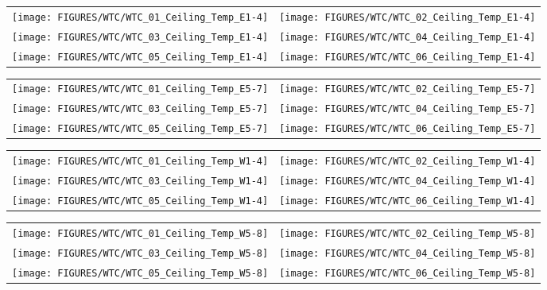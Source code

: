 \begin{figure}[p]
\begin{tabular*}{\textwidth}{l@{\extracolsep{\fill}}r}
\texttt{[image: FIGURES/WTC/WTC\_01\_Ceiling\_Temp\_E1-4]} &
\texttt{[image: FIGURES/WTC/WTC\_02\_Ceiling\_Temp\_E1-4]} \\
\texttt{[image: FIGURES/WTC/WTC\_03\_Ceiling\_Temp\_E1-4]} &
\texttt{[image: FIGURES/WTC/WTC\_04\_Ceiling\_Temp\_E1-4]} \\
\texttt{[image: FIGURES/WTC/WTC\_05\_Ceiling\_Temp\_E1-4]} &
\texttt{[image: FIGURES/WTC/WTC\_06\_Ceiling\_Temp\_E1-4]}
\end{tabular*}
\label{NIST_WTC_Ceiling_E1-4}
\end{figure}

\begin{figure}[p]
\begin{tabular*}{\textwidth}{l@{\extracolsep{\fill}}r}
\texttt{[image: FIGURES/WTC/WTC\_01\_Ceiling\_Temp\_E5-7]} &
\texttt{[image: FIGURES/WTC/WTC\_02\_Ceiling\_Temp\_E5-7]} \\
\texttt{[image: FIGURES/WTC/WTC\_03\_Ceiling\_Temp\_E5-7]} &
\texttt{[image: FIGURES/WTC/WTC\_04\_Ceiling\_Temp\_E5-7]} \\
\texttt{[image: FIGURES/WTC/WTC\_05\_Ceiling\_Temp\_E5-7]} &
\texttt{[image: FIGURES/WTC/WTC\_06\_Ceiling\_Temp\_E5-7]}
\end{tabular*}
\label{NIST_WTC_Ceiling_E5-7}
\end{figure}

\begin{figure}[p]
\begin{tabular*}{\textwidth}{l@{\extracolsep{\fill}}r}
\texttt{[image: FIGURES/WTC/WTC\_01\_Ceiling\_Temp\_W1-4]} &
\texttt{[image: FIGURES/WTC/WTC\_02\_Ceiling\_Temp\_W1-4]} \\
\texttt{[image: FIGURES/WTC/WTC\_03\_Ceiling\_Temp\_W1-4]} &
\texttt{[image: FIGURES/WTC/WTC\_04\_Ceiling\_Temp\_W1-4]} \\
\texttt{[image: FIGURES/WTC/WTC\_05\_Ceiling\_Temp\_W1-4]} &
\texttt{[image: FIGURES/WTC/WTC\_06\_Ceiling\_Temp\_W1-4]}
\end{tabular*}
\label{NIST_WTC_Ceiling_W1-4}
\end{figure}

\begin{figure}[p]
\begin{tabular*}{\textwidth}{l@{\extracolsep{\fill}}r}
\texttt{[image: FIGURES/WTC/WTC\_01\_Ceiling\_Temp\_W5-8]} &
\texttt{[image: FIGURES/WTC/WTC\_02\_Ceiling\_Temp\_W5-8]} \\
\texttt{[image: FIGURES/WTC/WTC\_03\_Ceiling\_Temp\_W5-8]} &
\texttt{[image: FIGURES/WTC/WTC\_04\_Ceiling\_Temp\_W5-8]} \\
\texttt{[image: FIGURES/WTC/WTC\_05\_Ceiling\_Temp\_W5-8]} &
\texttt{[image: FIGURES/WTC/WTC\_06\_Ceiling\_Temp\_W5-8]}
\end{tabular*}
\label{NIST_WTC_Ceiling_W5-8}
\end{figure}

